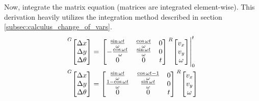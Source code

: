 Now, integrate the matrix equation (matrices are integrated element-wise). This
derivation heavily utilizes the integration method described in section
\ref{subsec:calculus_change_of_vars}.
\begin{align*}
  \prescript{G}{}{\begin{bmatrix}
    \Delta x \\
    \Delta y \\
    \Delta \theta
  \end{bmatrix}} &=
  \left.\begin{bmatrix}
     \frac{\sin\omega t}{\omega} & \frac{\cos\omega t}{\omega} & 0 \\
    -\frac{\cos\omega t}{\omega} & \frac{\sin\omega t}{\omega} & 0 \\
    0 & 0 & t
  \end{bmatrix}
  \prescript{R}{}{\begin{bmatrix}
    v_x \\
    v_y \\
    \omega
  \end{bmatrix}} \right|_0^t \\
  \prescript{G}{}{\begin{bmatrix}
    \Delta x \\
    \Delta y \\
    \Delta \theta
  \end{bmatrix}} &=
  \begin{bmatrix}
    \frac{\sin\omega t}{\omega} & \frac{\cos\omega t - 1}{\omega} & 0 \\
    \frac{1 - \cos\omega t}{\omega} & \frac{\sin\omega t}{\omega} & 0 \\
    0 & 0 & t
  \end{bmatrix}
  \prescript{R}{}{\begin{bmatrix}
    v_x \\
    v_y \\
    \omega
  \end{bmatrix}}
\end{align*}

